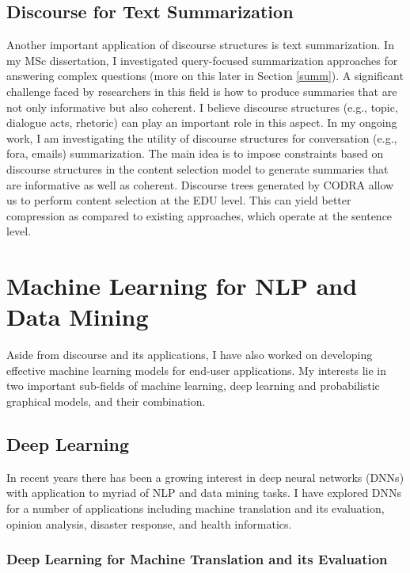 \documentclass{article} %
\begin{document}
\subsection{Discourse for Text Summarization}

Another important application of discourse structures is text summarization. In my MSc dissertation, I investigated query-focused summarization approaches for answering complex questions (more on this later in Section \ref{summ}). A significant challenge faced by researchers in this field is how to produce summaries that are not only informative but also coherent. I believe discourse structures (e.g., topic, dialogue acts, rhetoric) can play an important role in this aspect.  In my ongoing work, I am investigating the utility of discourse structures for conversation (e.g., fora, emails) summarization. The main idea is to impose constraints based on discourse structures  in the content selection model to generate summaries that are informative as well as coherent. Discourse trees generated by CODRA allow us to perform content selection at the EDU level. This can yield better compression as compared to existing approaches, which operate at the sentence level.   



\section{Machine Learning for NLP and Data Mining} \label{application_ML}

Aside from discourse and its applications, I have also worked on developing effective machine learning  models for end-user applications. My interests lie in two important sub-fields of machine learning, deep learning and probabilistic graphical models, and their combination.   


   


\subsection{Deep Learning}

In recent years there has been a growing interest in deep neural networks (DNNs) with application to myriad of NLP and data mining tasks. I have explored DNNs for a number of applications including machine translation and its evaluation, opinion analysis, disaster response, and health informatics.   


\subsubsection{Deep Learning for Machine Translation and its Evaluation}
\end{document}
